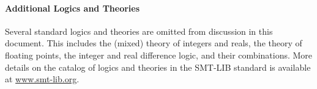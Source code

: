 \documentclass[english,a4paper,10pt]{article}
\begin{document}
\begin{appendix}

\paragraph{Additional Logics and Theories}
Several standard logics and theories are omitted from discussion in this document.
This includes the (mixed) theory of integers and reals,
the theory of floating points,
the integer and real difference logic,
and their combinations.
More details on the catalog of logics and theories in the SMT-LIB standard
is available at \url{www.smt-lib.org}.

\end{appendix}
\end{document}
